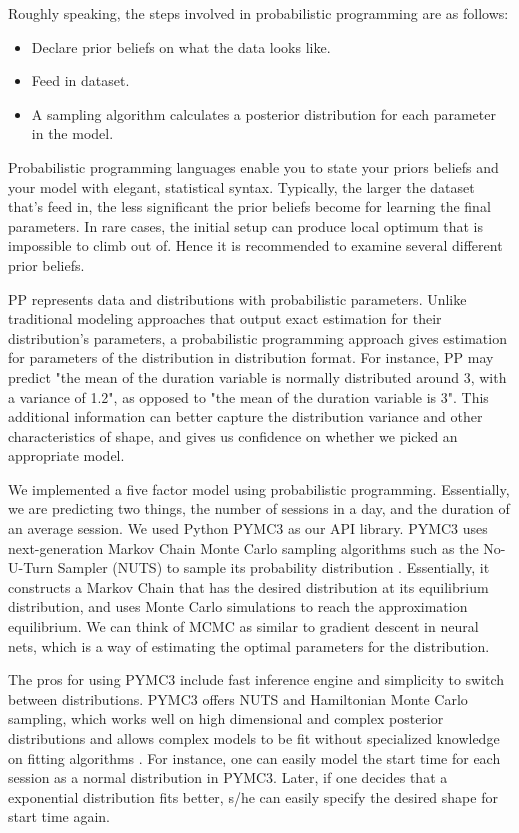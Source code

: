 \documentclass[]{article}
\begin{document}
Roughly speaking, the steps involved in probabilistic programming are as follows:
\begin{itemize}
\item
Declare prior beliefs on what the data looks like.
\item
Feed in dataset.
\item
A sampling algorithm calculates a posterior distribution for each parameter in the model.
\end{itemize}

Probabilistic programming languages enable you to state your priors beliefs and your model with elegant, statistical syntax. Typically, the larger the dataset that's feed in, the less significant the prior beliefs become for learning the final parameters. In rare cases, the initial setup can produce local optimum that is impossible to climb out of. Hence it is recommended to examine several different prior beliefs. 

PP represents data and distributions with probabilistic parameters. Unlike traditional modeling approaches that output exact estimation for their distribution's parameters, a probabilistic programming approach gives estimation for parameters of the distribution in distribution format. For instance, PP may predict "the mean of the duration variable is normally distributed around 3, with a variance of 1.2", as opposed to "the mean of the duration variable is 3". This additional information can better capture the distribution variance and other characteristics of shape, and gives us confidence on whether we picked an appropriate model.

We implemented a five factor model using probabilistic programming. Essentially, we are predicting two things, the number of sessions in a day, and the duration of an average session. We used Python PYMC3 as our API library. PYMC3 uses next-generation Markov Chain Monte Carlo sampling algorithms such as the No-U-Turn Sampler (NUTS) to sample its probability distribution \cite{pymc3}. Essentially, it constructs a Markov Chain that has the desired distribution at its equilibrium distribution, and uses Monte Carlo simulations to reach the approximation equilibrium. We can think of MCMC as similar to gradient descent in neural nets, which is a way of estimating the optimal parameters for the distribution. 

The pros for using PYMC3 include fast inference engine and simplicity to switch between distributions. PYMC3 offers NUTS and Hamiltonian Monte Carlo sampling, which works well on high dimensional and complex posterior distributions and allows complex models to be fit without specialized knowledge on fitting algorithms \cite{pymc3}. For instance, one can easily model the start time for each session as a normal distribution in PYMC3. Later, if one decides that a exponential distribution fits better, s/he can easily specify the desired shape for start time again.
\end{document}

